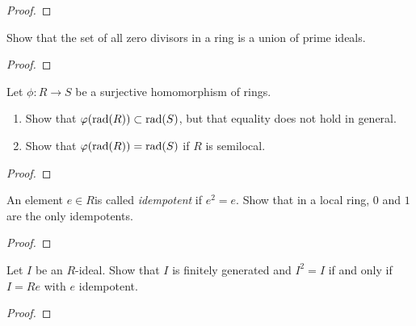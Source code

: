 \begin{proof}

\end{proof}
\newpage
\begin{problem}
Show that the set of all zero divisors in a ring is a union of
prime ideals.
\end{problem}
\begin{proof}
\end{proof}
\newpage
\begin{problem}
Let $\phi\colon R\to S$ be a surjective homomorphism of
rings.
\begin{enumerate}[noitemsep,label=(\alph*)]
\item Show that $\varphi(\mathrm{rad}(R))\subset\mathrm{rad}(S)$, but that
  equality does not hold in general.
\item Show that $\varphi(\mathrm{rad}(R))=\mathrm{rad}(S)$ if $R$ is semilocal.
\end{enumerate}
\end{problem}
\begin{proof}
\end{proof}
\newpage
\begin{problem}
An element $e\in R$is called \emph{idempotent} if $e^2=e$. Show
that in a local ring, $0$ and $1$ are the only idempotents.
\end{problem}
\begin{proof}
\end{proof}
\newpage
\begin{problem}
Let $I$ be an $R$-ideal. Show that $I$ is finitely generated and
$I^2=I$ if and only if $I=Re$ with $e$ idempotent.
\end{problem}
\begin{proof}
\end{proof}


